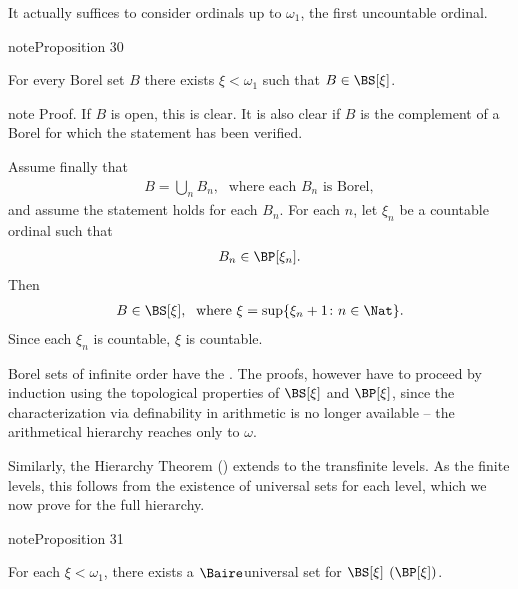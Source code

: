 \documentclass[letterpaper,10pt,english]{jupyterBook}
\begin{document}
\sphinxAtStartPar
It actually suffices to consider ordinals up to \(\omega_1\), the first uncountable ordinal.
\label{structureBorel:prop-Borel-omega1}
\begin{sphinxadmonition}{note}{Proposition 30}



\sphinxAtStartPar
For every Borel set \(B\) there exists \(\xi < \omega_1\) such that \(B \in \BS[\xi]\).
\end{sphinxadmonition}

\begin{sphinxadmonition}{note}
\sphinxAtStartPar
Proof. If \(B\) is open, this is clear. It is also clear if \(B\) is the complement of a Borel for which the statement has been verified.

\sphinxAtStartPar
Assume finally that
\begin{equation*}
\begin{split}
    B = \bigcup_n B_n, \; \text{ where each $B_n$ is Borel},
\end{split}
\end{equation*}
\sphinxAtStartPar
and assume the statement holds for each \(B_n\). For each \(n\), let \(\xi_n\) be a countable ordinal such that
\begin{equation*}
\begin{split}
    B_n \in \BP[{\xi_n}].
\end{split}
\end{equation*}
\sphinxAtStartPar
Then
\begin{equation*}
\begin{split}
    B \in \BS[\xi], \; \text{ where $\xi = \sup \{\xi_n +1 \colon n \in \Nat\}$}.
\end{split}
\end{equation*}
\sphinxAtStartPar
Since each \(\xi_n\) is countable, \(\xi\) is countable.
\end{sphinxadmonition}

\sphinxAtStartPar
Borel sets of infinite order have the . The proofs, however have to proceed by induction using the topological properties of \(\BS[\xi]\) and \(\BP[\xi]\), since the characterization via definability in arithmetic is no longer available – the arithmetical hierarchy reaches only to \(\omega\).

\sphinxAtStartPar
Similarly, the Hierarchy Theorem ({\hyperref[\detokenize{structureBorel:thm-Borel-proper}]{}}) extends to the transfinite levels. As the finite levels, this follows from the existence of universal sets for each level, which we now prove for the full hierarchy.
\label{structureBorel:prop-universal-general}
\begin{sphinxadmonition}{note}{Proposition 31}



\sphinxAtStartPar
For each \(\xi < \omega_1\), there exists a \(\Baire\)\sphinxhyphen{}universal set for \(\BS[\xi]\) \((\BP[\xi])\).
\end{sphinxadmonition}
\end{document}
